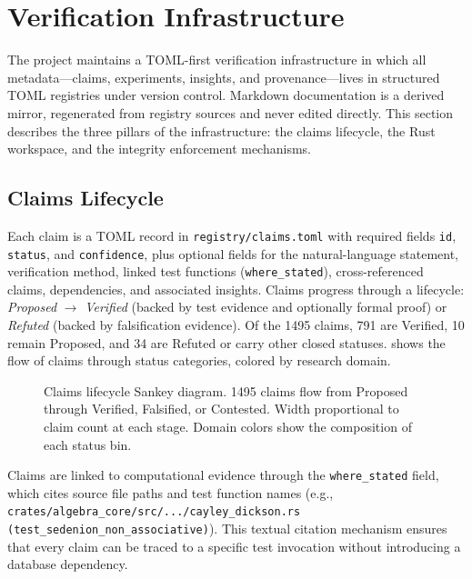 \documentclass[12pt,openany]{report}
\theoremstyle{definition}
\theoremstyle{plain}
\theoremstyle{remark}
\newcommand{\claimcount}{1495}
\begin{document}
\chapter{Verification Infrastructure}
\label{ch:evidence}

The project maintains a TOML-first verification infrastructure in which
all metadata---claims, experiments, insights, and provenance---lives in
structured TOML registries under version control.  Markdown
documentation is a derived mirror, regenerated from registry sources and
never edited directly.  This section describes the three pillars of the
infrastructure: the claims lifecycle, the Rust workspace, and the
integrity enforcement mechanisms.

\section{Claims Lifecycle}

Each claim is a TOML record in \texttt{registry/claims.toml} with
required fields \texttt{id}, \texttt{status}, and \texttt{confidence},
plus optional fields for the natural-language statement, verification
method, linked test functions (\texttt{where\_stated}), cross-referenced
claims, dependencies, and associated insights.  Claims progress through
a lifecycle: \emph{Proposed} $\to$ \emph{Verified} (backed by test
evidence and optionally formal proof) or \emph{Refuted} (backed by
falsification evidence).  Of the \claimcount{} claims, 791 are Verified,
10 remain Proposed, and 34 are Refuted or carry other closed statuses.
 shows the flow of claims through status
categories, colored by research domain.

\begin{figure}[htbp]
\centering

\caption{Claims lifecycle Sankey diagram.  \claimcount{} claims flow
from Proposed through Verified, Falsified, or Contested.  Width
proportional to claim count at each stage.  Domain colors show the
composition of each status bin.}
\label{fig:claims-sankey}
\end{figure}

Claims are linked to computational evidence through the
\texttt{where\_stated} field, which cites source file paths and test
function names (e.g., \texttt{crates/algebra\_core/src/.../cayley\_dickson.rs
(test\_sedenion\_non\_associative)}).  This textual citation mechanism
ensures that every claim can be traced to a specific test invocation
without introducing a database dependency.
\end{document}
